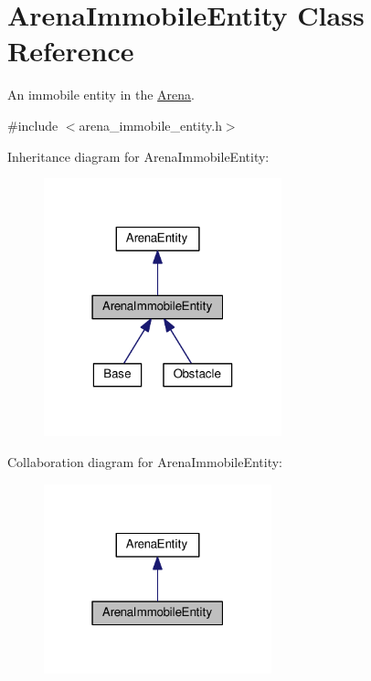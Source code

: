 \hypertarget{classArenaImmobileEntity}{}\section{Arena\+Immobile\+Entity Class Reference}
\label{classArenaImmobileEntity}


An immobile entity in the \hyperlink{classArena}{Arena}.  




{\ttfamily \#include $<$arena\+\_\+immobile\+\_\+entity.\+h$>$}



Inheritance diagram for Arena\+Immobile\+Entity\+:
\nopagebreak
\begin{figure}[H]
\begin{center}
\leavevmode
\includegraphics[width=195pt]{classArenaImmobileEntity__inherit__graph}
\end{center}
\end{figure}


Collaboration diagram for Arena\+Immobile\+Entity\+:
\nopagebreak
\begin{figure}[H]
\begin{center}
\leavevmode
\includegraphics[width=187pt]{classArenaImmobileEntity__coll__graph}
\end{center}
\end{figure}
